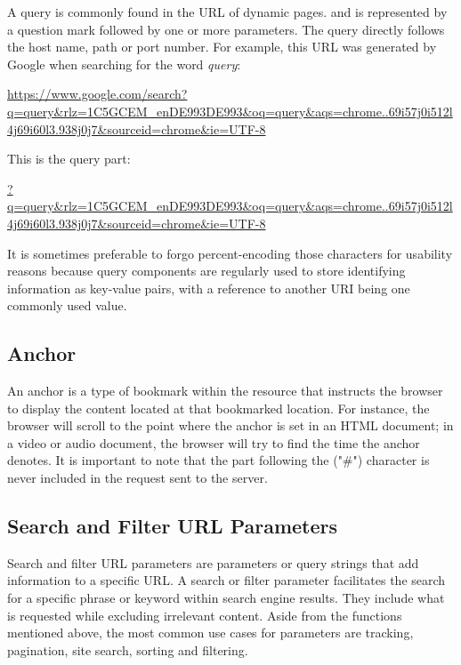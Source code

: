 A query is commonly found in the URL of dynamic pages. and is represented by a question mark followed by one or more parameters. The query directly follows the host name, path or port number. For example, this URL was generated by Google when searching for the word \emph{query}:

\begin{center}
  \url{https://www.google.com/search?q=query&rlz=1C5GCEM_enDE993DE993&oq=query&aqs=chrome..69i57j0i512l4j69i60l3.938j0j7&sourceid=chrome&ie=UTF-8}
\end{center}

\noindent This is the query part:

\begin{center}
  \url{?q=query&rlz=1C5GCEM_enDE993DE993&oq=query&aqs=chrome..69i57j0i512l4j69i60l3.938j0j7&sourceid=chrome&ie=UTF-8}
\end{center}

It is sometimes preferable to forgo percent-encoding those characters for usability reasons because query components are regularly used to store identifying information as key-value pairs, with a reference to another URI being one commonly used value.

\subsection*{Anchor}
An anchor is a type of bookmark within the resource that instructs the browser to display the content located at that bookmarked location. For instance, the browser will scroll to the point where the anchor is set in an HTML document; in a video or audio document, the browser will try to find the time the anchor denotes. It is important to note that the part following the ("\#") character is never included in the request sent to the server.

\subsection{Search and Filter URL Parameters}
Search and filter URL parameters are parameters or query strings that add information to a specific URL. A search or filter parameter facilitates the search for a specific phrase or keyword within search engine results. They include what is requested while excluding irrelevant content. Aside from the functions mentioned above, the most common use cases for parameters are tracking, pagination, site search, sorting and filtering.


